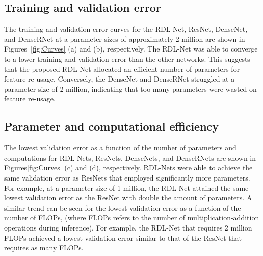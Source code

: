 \documentclass[letterpaper]{article} \usepackage{aaai20}  \usepackage{times}  \usepackage{helvet} \usepackage{courier}  \usepackage[hyphens]{url}  \usepackage{graphicx} \urlstyle{rm} \def\UrlFont{\rm}  \usepackage{graphicx}  \frenchspacing  \setlength{\pdfpagewidth}{8.5in}  \setlength{\pdfpageheight}{11in}
\begin{document}
\subsection{Training and validation error}
The training and validation error curves for the RDL-Net, ResNet, DenseNet, and DenseRNet at a parameter sizes of approximately 2 million are shown in Figures~\ref{fig:Curves} (a) and (b), respectively. The RDL-Net was able to converge to a lower training and validation error than the other networks. This suggests that the proposed RDL-Net allocated an efficient number of parameters for feature re-usage. Conversely, the DenseNet and DenseRNet struggled at a parameter size of 2 million, indicating that too many parameters were wasted on feature re-usage.  

\subsection{Parameter and computational efficiency}

The lowest validation error as a function of the number of parameters and computations for RDL-Nets, ResNets, DenseNets, and DenseRNets are shown in Figures\ref{fig:Curves} (c) and (d), respectively. RDL-Nets were able to achieve the same validation error as ResNets that employed significantly more parameters. For example, at a parameter size of 1 million, the RDL-Net attained the same lowest validation error as the ResNet with double the amount of parameters. A similar trend can be seen for the lowest validation error as a function of the number of FLOPs, (where FLOPs refers to the number of multiplication-addition operations during inference). For example, the RDL-Net that requires 2 million FLOPs achieved a lowest validation error similar to that of the ResNet that requires  as many FLOPs.
\end{document}
